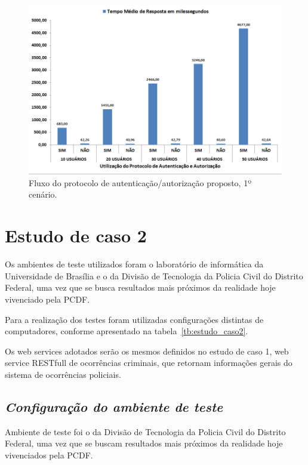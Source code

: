 \begin{figure}[!htb]
    \centering
    \includegraphics[width=1.0\textwidth]{grafico_teste_desempenho.png}
    \caption{Fluxo do protocolo de autenticação/autorização proposto, 1º cenário.}
    \label{fig:grafico_teste_desempenho}
\end{figure}


\section{Estudo de caso 2}\label{sec:caso2}

Os ambientes de teste utilizados foram o laboratório de informática da Universidade de Brasília e o da Divisão de Tecnologia da Policia Civil do Distrito Federal, uma vez que se busca resultados mais próximos da realidade hoje vivenciado pela PCDF.

Para a realização dos testes foram utilizadas configurações distintas de computadores, conforme apresentado na tabela~\ref{tb:estudo_caso2}.

Os web services adotados serão os mesmos definidos no estudo de caso 1, web service RESTfull de ocorrências criminais, que retornam informações gerais do sistema de ocorrências policiais.

\subsection{\emph{Configuração do ambiente de teste}}

Ambiente de teste foi o da Divisão de Tecnologia da Policia Civil do Distrito Federal, uma vez que se buscam resultados mais próximos da realidade hoje vivenciados pela PCDF.

